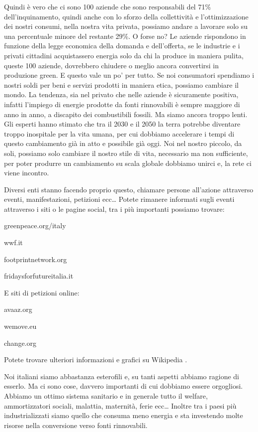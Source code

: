 \documentclass[12pt]{book} %
\begin{document}
Quindi è vero che ci sono 100 aziende che sono responsabili del 71\% dell'inquinamento, quindi
anche con lo sforzo della collettività e l'ottimizzazione dei nostri consumi, nella nostra vita
privata, possiamo andare a lavorare solo su una percentuale minore del restante 29\%. O forse no? Le aziende rispondono
in funzione della legge economica della domanda e dell'offerta, se le industrie e i privati
cittadini acquistassero energia solo da chi la produce in maniera pulita, queste 100 aziende, dovrebbero chiudere o
meglio ancora convertirsi in produzione green. E questo vale un po' per tutto. Se noi consumatori
spendiamo i nostri soldi per beni e servizi prodotti in maniera etica, possiamo cambiare il mondo. La tendenza, sia nel
privato che nelle aziende è sicuramente positiva, infatti l'impiego di energie prodotte da fonti
rinnovabili è sempre maggiore di anno in anno, a discapito dei combustibili fossili. Ma siamo ancora troppo lenti. Gli
esperti hanno stimato che tra il 2030 e il 2050 la terra potrebbe diventare troppo inospitale per la vita umana, per
cui dobbiamo accelerare i tempi di questo cambiamento già in atto e possibile già oggi. Noi nel nostro piccolo, da
soli, possiamo solo cambiare il nostro stile di vita, necessario ma non sufficiente, per poter produrre un cambiamento
su scala globale dobbiamo unirci e, la rete ci viene incontro.

Diversi enti stanno facendo proprio questo, chiamare persone all'azione attraverso eventi,
manifestazioni, petizioni ecc… Potete rimanere informati sugli eventi attraverso i siti o le pagine social, tra i più
importanti possiamo trovare:

greenpeace.org/italy

wwf.it

footprintnetwork.org

fridaysforfutureitalia.it 


\bigskip

E siti di petizioni online:

avaaz.org

wemove.eu

change.org


\bigskip

Potete trovare ulteriori informazioni e grafici su
Wikipedia
.


\bigskip

Noi italiani siamo abbastanza esterofili e, su tanti aspetti abbiamo ragione di esserlo. Ma ci sono cose, davvero
importanti di cui dobbiamo essere orgogliosi. Abbiamo un ottimo sistema sanitario e in generale tutto il
welfare, ammortizzatori
sociali, malattia, maternità, ferie ecc… Inoltre tra i paesi più industrializzati siamo quello che consuma meno energia
e sta investendo molte risorse nella conversione verso fonti rinnovabili.
\end{document}
